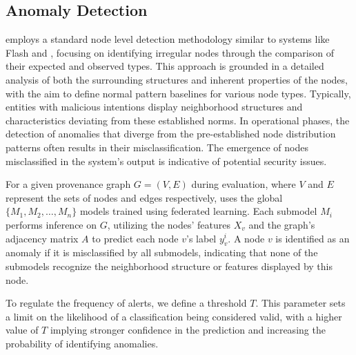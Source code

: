 \subsection{Anomaly Detection}
\label{sys:anomaly_detection}

\Sys employs a standard node level detection methodology similar to systems like Flash and \threatrace, focusing on identifying irregular nodes through the comparison of their expected and observed types. This approach is grounded in a detailed analysis of both the surrounding structures and inherent properties of the nodes, with the aim to define normal pattern baselines for various node types. Typically, entities with malicious intentions display neighborhood structures and characteristics deviating from these established norms. In operational phases, the detection of anomalies that diverge from the pre-established node distribution patterns often results in their misclassification. The emergence of nodes misclassified in the system's output is indicative of potential security issues.

For a given provenance graph \(G = (V, E)\) during evaluation, where \(V\) and \(E\) represent the sets of nodes and edges respectively, \Sys uses the global \(\{M_1, M_2, \ldots, M_n\}\) \gnnshort models trained using federated learning. Each submodel \(M_i\) performs inference on \(G\), utilizing the nodes' features \(X_v\) and the graph's adjacency matrix \(A\) to predict each node \(v\)'s label \(y_v^i\). A node \(v\) is identified as an anomaly if it is misclassified by all submodels, indicating that none of the submodels recognize the neighborhood structure or features displayed by this node. 

To regulate the frequency of alerts, we define a threshold \(T\). This parameter sets a limit on the likelihood of a classification being considered valid, with a higher value of \(T\) implying stronger confidence in the prediction and increasing the probability of identifying anomalies. 
